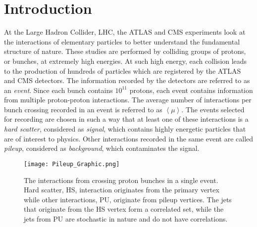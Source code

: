 \section{Introduction}\hfill


At the Large Hadron Collider, LHC, the ATLAS and CMS experiments look at the interactions of elementary particles to better understand the fundamental structure of nature. These studies are performed by colliding groups of protons, or bunches, at extremely high energies. At such high energy, each collision leads to the production of hundreds of particles which are registered by the ATLAS and CMS detectors. The information recorded by the detectors are referred to as an \emph{event}. Since each bunch contains $10^{11}$ protons, each event contains information from multiple proton-proton interactions. The average number of interactions per bunch crossing recorded in an event is referred to as $\left\langle \mu \right\rangle$. The events selected for recording are chosen in such a way that at least one of these interactions is a \emph{hard scatter}, considered as \emph{signal}, which contains highly energetic particles that are of interest to physics. Other interactions recorded in the same event are called \emph{pileup}, considered as \emph{background}, which contaminates the signal.

\begin{figure}[ht]
\centering
  \texttt{[image: Pileup\_Graphic.png]} 
  \caption{The interactions from crossing proton bunches in a single event. Hard scatter, HS, interaction originates from the primary vertex while other interactions, PU, originate from pileup vertices. The jets that originate from the HS vertex form a correlated set, while the jets from PU are stochastic in nature and do not have correlations.}
\label{fig:PileupJets}
\end{figure}

